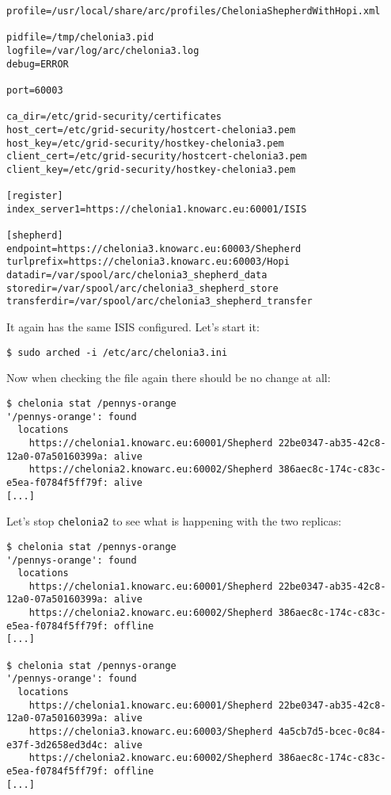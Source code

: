 \documentclass{article}
\begin{document}
\begin{verbatim}
profile=/usr/local/share/arc/profiles/CheloniaShepherdWithHopi.xml

pidfile=/tmp/chelonia3.pid
logfile=/var/log/arc/chelonia3.log
debug=ERROR

port=60003

ca_dir=/etc/grid-security/certificates
host_cert=/etc/grid-security/hostcert-chelonia3.pem
host_key=/etc/grid-security/hostkey-chelonia3.pem
client_cert=/etc/grid-security/hostcert-chelonia3.pem
client_key=/etc/grid-security/hostkey-chelonia3.pem

[register]
index_server1=https://chelonia1.knowarc.eu:60001/ISIS

[shepherd]
endpoint=https://chelonia3.knowarc.eu:60003/Shepherd
turlprefix=https://chelonia3.knowarc.eu:60003/Hopi
datadir=/var/spool/arc/chelonia3_shepherd_data
storedir=/var/spool/arc/chelonia3_shepherd_store
transferdir=/var/spool/arc/chelonia3_shepherd_transfer
\end{verbatim}

It again has the same ISIS configured. Let's start it:

\begin{verbatim}
$ sudo arched -i /etc/arc/chelonia3.ini
\end{verbatim}

Now when checking the file again there should be no change at all:

\begin{verbatim}
$ chelonia stat /pennys-orange
'/pennys-orange': found
  locations
    https://chelonia1.knowarc.eu:60001/Shepherd 22be0347-ab35-42c8-12a0-07a50160399a: alive
    https://chelonia2.knowarc.eu:60002/Shepherd 386aec8c-174c-c83c-e5ea-f0784f5ff79f: alive
[...]
\end{verbatim}

Let's stop \verb!chelonia2! to see what is happening with the two replicas:

\begin{verbatim}
$ chelonia stat /pennys-orange
'/pennys-orange': found
  locations
    https://chelonia1.knowarc.eu:60001/Shepherd 22be0347-ab35-42c8-12a0-07a50160399a: alive
    https://chelonia2.knowarc.eu:60002/Shepherd 386aec8c-174c-c83c-e5ea-f0784f5ff79f: offline
[...]

$ chelonia stat /pennys-orange
'/pennys-orange': found
  locations
    https://chelonia1.knowarc.eu:60001/Shepherd 22be0347-ab35-42c8-12a0-07a50160399a: alive
    https://chelonia3.knowarc.eu:60003/Shepherd 4a5cb7d5-bcec-0c84-e37f-3d2658ed3d4c: alive
    https://chelonia2.knowarc.eu:60002/Shepherd 386aec8c-174c-c83c-e5ea-f0784f5ff79f: offline
[...]

\end{verbatim}
\end{document}
